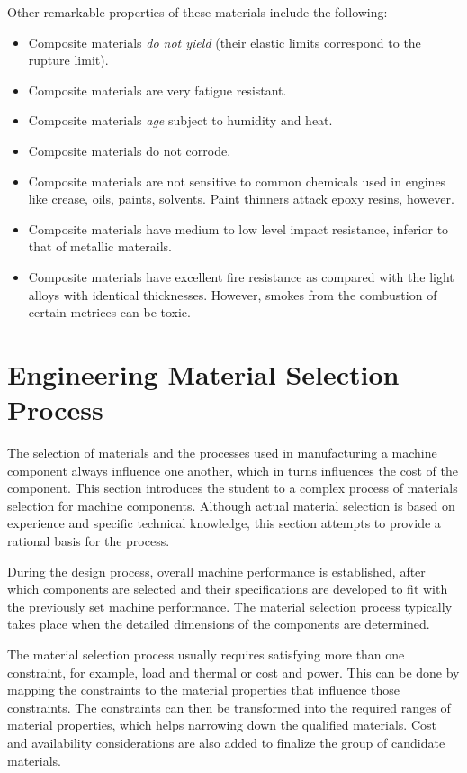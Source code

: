 \documentclass[
10pt,
a4paper,
openany,
svgnames,
]{book}
\begin{document}
Other remarkable properties of these materials include the following:

\begin{itemize}
\item Composite materials \emph{do not yield} (their elastic limits correspond to the rupture limit).
\item Composite materials are very fatigue resistant.
\item Composite materials \emph{age} subject to humidity and heat.
\item Composite materials do not corrode.
\item Composite materials are not sensitive to common chemicals used in engines like crease, oils, paints, solvents. Paint thinners attack epoxy resins, however.
\item Composite materials have medium to low level impact resistance, inferior to that of metallic materails.
\item Composite materials have excellent fire resistance as compared with the light alloys with identical thicknesses. However, smokes from the combustion of certain metrices can be toxic.
\end{itemize}

\section{Engineering Material Selection Process}

The selection of materials and the processes used in manufacturing a machine component always influence one another, which in turns influences the cost of the component. This section introduces the student to a complex process of materials selection for machine components. Although actual material selection is based on experience and specific technical knowledge, this section attempts to provide a rational basis for the process.

During the design process, overall machine performance is established, after which components are selected and their specifications are developed to fit with the previously set machine performance. The material selection process typically takes place when the detailed dimensions of the components are determined.

The material selection process usually requires satisfying more than one constraint, for example, load and thermal or cost and power. This can be done by mapping the constraints to the material properties that influence those constraints. The constraints can then be transformed into the required ranges of material properties, which helps narrowing down the qualified materials. Cost and availability considerations are also added to finalize the group of candidate materials.
\end{document}
